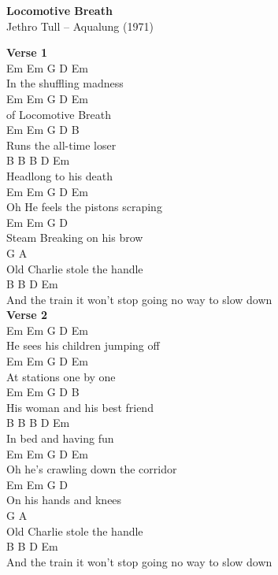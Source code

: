 \documentclass[a4paper]{article}
\begin{document}
    \begin{center}
        \textbf{Locomotive Breath}
        ~\\
        Jethro Tull -- Aqualung (1971)
    \end{center}
    {
        \scriptsize
        \textbf{Verse 1}
        ~\\
        {
            \cutive
            \obeyspaces
Em                Em  G D Em
\\
In the shuffling madness
\\
Em                  Em  G D Em
\\
of Locomotive Breath
\\
Em                Em  G D B
\\
Runs the all-time loser
\\
B                B  B D Em
\\
Headlong to his death
\\
Em                Em  G D Em
\\
Oh He feels the pistons scraping
\\
Em                Em  G D
\\
Steam Breaking on his brow
\\
G                   A
\\
Old Charlie stole the handle
\\
        B                         B      D       Em
\\
And the train it won't stop going no way to slow down
\\

        }
        \textbf{Verse 2}
        ~\\
        {
            \cutive
            \obeyspaces
Em                Em  G D Em
\\
He sees his children jumping off
\\
Em                  Em  G D Em
\\
At stations one by one
\\
Em                Em  G D B
\\
His woman and his best friend
\\
B                B  B D Em
\\
In bed and having fun
\\
Em                Em  G D Em
\\
Oh he's crawling down the corridor
\\
Em                Em  G D
\\
On his hands and knees
\\
G                   A
\\
Old Charlie stole the handle
\\
        B                         B      D       Em
\\
And the train it won't stop going no way to slow down
\\

}}
\end{document}
